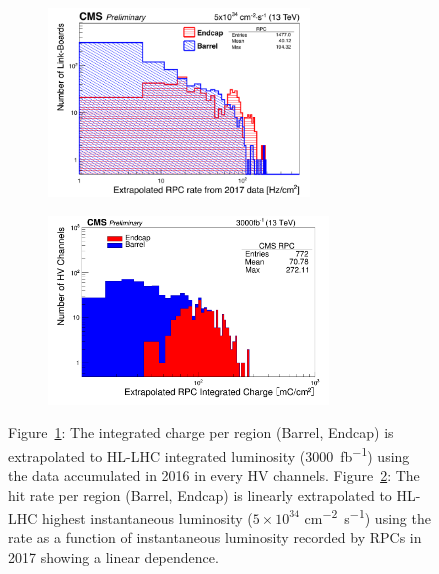 	\begin{figure}[H]
		\begin{subfigure}{0.5\linewidth}
			\centering
			\includegraphics[height=5cm]{fig/chapt5/RPC-Rate-HL-LHC_2017.png}
			\caption{\label{fig:RPC-HL-LHC:A}}
		\end{subfigure}
		\begin{subfigure}{0.5\linewidth}
			\centering
			\includegraphics[height=5cm]{fig/chapt5/RPC-IC-HL-LHC_2016.png}
			\caption{\label{fig:RPC-HL-LHC:B}}
		\end{subfigure}
		\caption{\label{fig:RPC-HL-LHC} Figure~\ref{fig:RPC-HL-LHC:A}: The integrated charge per region (Barrel, Endcap) is extrapolated to HL-LHC integrated luminosity (\SI{3000}{fb^{-1}}) using the data accumulated in 2016 in every HV channels. Figure~\ref{fig:RPC-HL-LHC:B}: The hit rate per region (Barrel, Endcap) is linearly extrapolated to HL-LHC highest instantaneous luminosity ($5\times10^{34}$ \si{cm^{-2}s^{-1}}) using the rate as a function of instantaneous luminosity recorded by RPCs in 2017 showing a linear dependence.}
	\end{figure}
    
